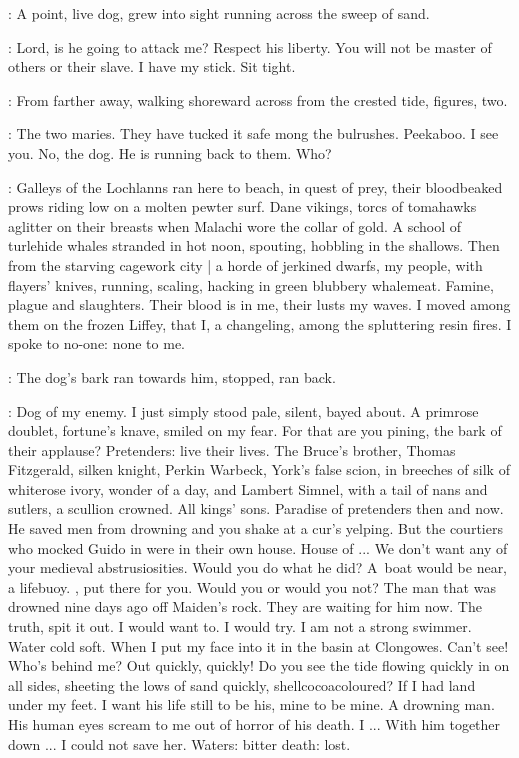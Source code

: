 :
A point, live dog,
grew into sight running across the sweep of sand.

\StephenInt:
Lord, is he going to attack me?
Respect his liberty.
You will not be master of others or their slave.
I have my stick.
Sit tight.

:
From farther away,
walking shoreward across from the crested tide,
figures, two.

\StephenInt:
The two maries.
They have tucked it safe mong the bulrushes.
Peekaboo.
I see you.
No, the dog.
He is running back to them.
Who?

\StephenInt:
Galleys of the Lochlanns ran here to beach,
in quest of prey,
their bloodbeaked prows riding low on a molten pewter surf.
Dane vikings,
torcs of tomahawks aglitter on their breasts
when Malachi wore the collar of gold.
A school of turlehide whales stranded in hot noon, spouting,
hobbling in the shallows.
Then from the starving cagework city |
a horde of jerkined dwarfs,
my people, with flayers' knives,
running, scaling, hacking in green blubbery whalemeat.
Famine, plague and slaughters.
Their blood is in me, their lusts my waves.
I moved among them on the frozen Liffey,
that I, a changeling, among the spluttering resin fires.
I spoke to no-one:
none to me.

:
The dog's bark ran towards him, stopped, ran back.

\StephenInt:
Dog of my enemy.
I just simply stood pale, silent, bayed about.
A primrose doublet, fortune's knave, smiled on my fear.
For that are you pining,
the bark of their applause?
Pretenders:
live their lives.
The Bruce's brother,
Thomas Fitzgerald, silken knight,
Perkin Warbeck, York's false scion,
in breeches of silk of whiterose ivory,
wonder of a day,
and Lambert Simnel, with a tail of nans and sutlers, a scullion crowned.
All kings' sons.
Paradise of pretenders then and now.
He saved men from drowning
and you shake at a cur's yelping.
But the courtiers who mocked Guido in 
were in their own house.
House of ...
We don't want any of your medieval abstrusiosities.
Would you do what he did?
A~boat would be near, a lifebuoy.
, put there for you.
Would you or would you not?
The man that was drowned nine days ago off Maiden's rock.
They are waiting for him now.
The truth, spit it out.
I would want to.
I would try.
I am not a strong swimmer.
Water cold soft.
When I put my face into it in the basin at Clongowes.
Can't see!
Who's behind me?
Out quickly, quickly!
Do you see the tide flowing quickly in on all sides,
sheeting the lows of sand quickly, shell\-cocoa\-coloured?
If I had land under my feet.
I want his life still to be his, mine to be mine.
A drowning man.
His human eyes scream to me out of horror of his death.
I ...
With him together down ...
I could not save her.
Waters:
bitter death:
lost.

